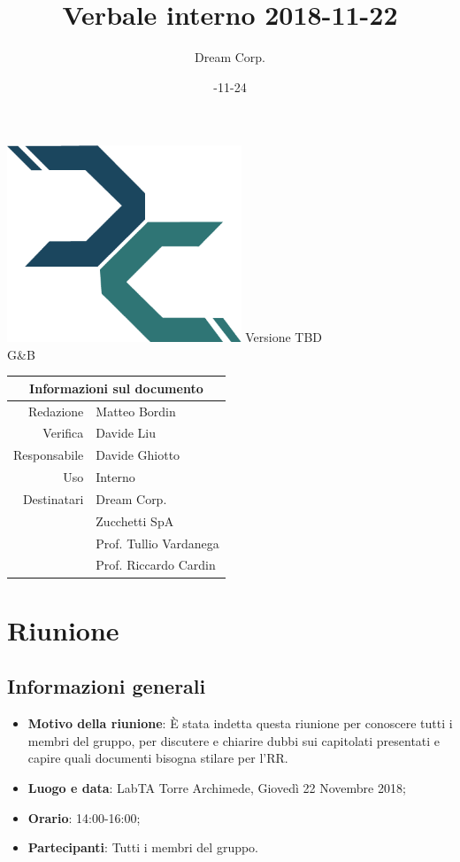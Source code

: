 \documentclass[12pt]{article}
\title{\myfont Verbale interno 2018-11-22}
\author{Dream Corp.}
\date{\myfont 2018-11-24}
\newcommand{\version}{Versione TBD}
\begin{document}
	\maketitle
	\begin{center}
		\includegraphics[width = 70mm]{../logo.png}\newline
		\huge \version 
		\\G\&B
		
		\begin{table}[h!]
			\centering
			\begin{tabular}{r|l}
					\multicolumn{2}{c}{Informazioni sul documento}\\
			        \hline
        			Redazione & Matteo Bordin\\
        			Verifica & Davide Liu\\
        			Responsabile & Davide Ghiotto\\
        			Uso & Interno\\
        			Destinatari & Dream Corp. \\
        			& Zucchetti SpA\\
        			& Prof. Tullio Vardanega\\
        			& Prof. Riccardo Cardin\\
			\end{tabular}
		\end{table}
		
\end{center}


\section{Riunione}
    \subsection{Informazioni generali}
    \begin{itemize}
        \item \textbf{Motivo della riunione}: È stata indetta questa riunione per conoscere tutti i membri del gruppo, per discutere e chiarire dubbi sui capitolati presentati e capire quali documenti bisogna stilare per l'RR.
        \item \textbf{Luogo e data}: LabTA Torre Archimede, Giovedì 22 Novembre 2018;
        \item \textbf{Orario}: 14:00-16:00;
        \item \textbf{Partecipanti}: Tutti i membri del gruppo.

    \end{itemize}
    \newpage
\end{document}
